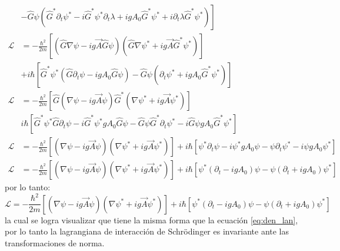 \begin{align*}
    &\left. -\hat{G}\psi \left(\hat{G}^* \partial_t \psi^* -i\hat{G}^* \psi^* \partial_t \lambda + igA_0 \hat{G}^* \psi^* +i\partial_t \lambda \hat{G}^* \psi^*  \right) \right]\\
    \mathcal{L}& = -\frac{\hbar^2}{2m} \left[\left(\hat{G}\nabla\psi - ig\vec{A}\hat{G}\psi\right)\left(\hat{G}\nabla \psi^* + ig \vec{A}\hat{G}^* \psi^* \right)\right] \\ 
    &+ i\hbar \left[\hat{G}^* \psi^* \left(\hat{G}\partial_t \psi - igA_0 \hat{G}\psi  \right)-\hat{G}\psi\left(\partial_t \psi^* + igA_0 \hat{G}^* \psi^*\right)\right]\\
    \mathcal{L} & = -\frac{\hbar^2}{2m} \left[\hat{G}\left(\nabla \psi - ig\vec{A}\psi \right)\hat{G}^* \left(\nabla \psi^* + ig\vec{A}\psi^*\right) \right] \\
    & i \hbar \left[\hat{G}^* \psi^* \hat{G}\partial_t \psi-i\hat{G}^* \psi^* gA_0 \hat{G}\psi - \hat{G}\psi \hat{G}^* \partial_t \psi^* - i\hat{G}\psi g A_0 \hat{G}^* \psi^*\right]\\
    \mathcal{L} &= -\frac{\hbar^2}{2m} \left[\left(\nabla \psi -ig\vec{A} \psi \right)\left(\nabla \psi^* +ig\vec{A} \psi^*\right) \right]  + i\hbar \left[\psi^* \partial_t \psi -i \psi^* g A_0 \psi - \psi \partial_t \psi^* - i\psi g A_0 \psi^* \right]\\
    \mathcal{L} &= -\frac{\hbar^2}{2m} \left[\left(\nabla \psi -ig\vec{A} \psi \right)\left(\nabla \psi^* +ig\vec{A} \psi^*\right) \right] + i\hbar \left[\psi^*\left( \partial_t - igA_0\right)\psi  - \psi \left(\partial_t + igA_0 \right)\psi^* \right]
\end{align*}
por lo tanto:
\begin{equation}
    \mathcal{L} = -\frac{\hbar^2}{2m} \left[\left(\nabla \psi -ig\vec{A} \psi \right)\left(\nabla \psi^* +ig\vec{A} \psi^*\right) \right] + i\hbar \left[\psi^*\left( \partial_t - igA_0\right)\psi  - \psi \left(\partial_t + igA_0 \right)\psi^* \right]
    \label{eq:den_l_norma}
\end{equation}
la cual se logra visualizar que tiene la misma forma que la ecuación \ref{eq:den_lan}, por lo tanto la lagrangiana de interacción de Schr\"odinger es invariante ante las transformaciones de norma.